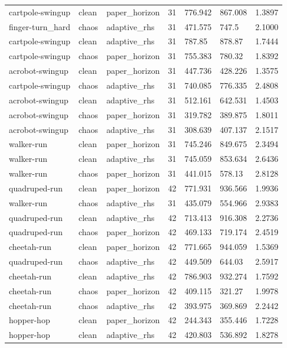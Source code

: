 \begin{tabular}{lllllll}
cartpole-swingup & clean & paper\_horizon & 31 & 776.942 & 867.008 & 1.3897 \\
finger-turn\_hard & chaos & adaptive\_rhs & 31 & 471.575 & 747.5 & 2.1000 \\
cartpole-swingup & clean & adaptive\_rhs & 31 & 787.85 & 878.87 & 1.7444 \\
cartpole-swingup & chaos & paper\_horizon & 31 & 755.383 & 780.32 & 1.8392 \\
acrobot-swingup & clean & paper\_horizon & 31 & 447.736 & 428.226 & 1.3575 \\
cartpole-swingup & chaos & adaptive\_rhs & 31 & 740.085 & 776.335 & 2.4808 \\
acrobot-swingup & clean & adaptive\_rhs & 31 & 512.161 & 642.531 & 1.4503 \\
acrobot-swingup & chaos & paper\_horizon & 31 & 319.782 & 389.875 & 1.8011 \\
acrobot-swingup & chaos & adaptive\_rhs & 31 & 308.639 & 407.137 & 2.1517 \\
walker-run & clean & paper\_horizon & 31 & 745.246 & 849.675 & 2.3494 \\
walker-run & clean & adaptive\_rhs & 31 & 745.059 & 853.634 & 2.6436 \\
walker-run & chaos & paper\_horizon & 31 & 441.015 & 578.13 & 2.8128 \\
quadruped-run & clean & paper\_horizon & 42 & 771.931 & 936.566 & 1.9936 \\
walker-run & chaos & adaptive\_rhs & 31 & 435.079 & 554.966 & 2.9383 \\
quadruped-run & clean & adaptive\_rhs & 42 & 713.413 & 916.308 & 2.2736 \\
quadruped-run & chaos & paper\_horizon & 42 & 469.133 & 719.174 & 2.4519 \\
cheetah-run & clean & paper\_horizon & 42 & 771.665 & 944.059 & 1.5369 \\
quadruped-run & chaos & adaptive\_rhs & 42 & 449.509 & 644.03 & 2.5917 \\
cheetah-run & clean & adaptive\_rhs & 42 & 786.903 & 932.274 & 1.7592 \\
cheetah-run & chaos & paper\_horizon & 42 & 409.115 & 321.27 & 1.9978 \\
cheetah-run & chaos & adaptive\_rhs & 42 & 393.975 & 369.869 & 2.2442 \\
hopper-hop & clean & paper\_horizon & 42 & 244.343 & 355.446 & 1.7228 \\
hopper-hop & clean & adaptive\_rhs & 42 & 420.803 & 536.892 & 1.8278 \\

\end{tabular}
